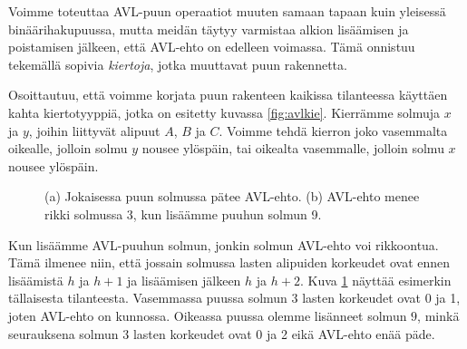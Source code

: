 Voimme toteuttaa AVL-puun operaatiot muuten samaan tapaan
kuin yleisessä binäärihakupuussa, mutta meidän täytyy varmistaa
alkion lisäämisen ja poistamisen jälkeen, että AVL-ehto
on edelleen voimassa.
Tämä onnistuu tekemällä sopivia \emph{kiertoja},
jotka muuttavat puun rakennetta.

Osoittautuu, että voimme korjata puun rakenteen kaikissa
tilanteessa käyttäen kahta kiertotyyppiä,
jotka on esitetty kuvassa \ref{fig:avlkie}.
Kierrämme solmuja $x$ ja $y$,
joihin liittyvät alipuut $A$, $B$ ja $C$.
Voimme tehdä kierron joko vasemmalta oikealle,
jolloin solmu $y$ nousee ylöspäin,
tai oikealta vasemmalle,
jolloin solmu $x$ nousee ylöspäin.

\begin{figure}
\center
{}
\caption{(a) Jokaisessa puun solmussa pätee AVL-ehto.
(b) AVL-ehto menee rikki solmussa 3, kun lisäämme puuhun solmun 9.}
\label{fig:avlrik}
\end{figure}

Kun lisäämme AVL-puuhun solmun, jonkin solmun AVL-ehto
voi rikkoontua. Tämä ilmenee niin,
että jossain solmussa lasten alipuiden korkeudet ovat ennen lisäämistä
$h$ ja $h+1$ ja lisäämisen jälkeen $h$ ja $h+2$.
Kuva \ref{fig:avlrik} näyttää esimerkin tällaisesta tilanteesta.
Vasemmassa puussa solmun $3$ lasten korkeudet ovat 0 ja 1,
joten AVL-ehto on kunnossa.
Oikeassa puussa olemme lisänneet solmun $9$,
minkä seurauksena solmun $3$ lasten korkeudet ovat 0 ja 2
eikä AVL-ehto enää päde.

